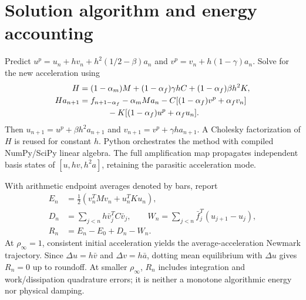 \documentclass[10pt,a4paper]{article}
\begin{document}
\section{Solution algorithm and energy accounting}
Predict $u^p=u_n+h v_n+h^2(1/2-\beta)a_n$ and $v^p=v_n+h(1-\gamma)a_n$. Solve for the new acceleration using
\begin{align}
H&=(1-\alpha_m)M+(1-\alpha_f)\gamma h C+(1-\alpha_f)\beta h^2K,\\
Ha_{n+1}&=f_{n+1-\alpha_f}-\alpha_mMa_n
-C[(1-\alpha_f)v^p+\alpha_f v_n]\nonumber\\
&\hspace{12mm}-K[(1-\alpha_f)u^p+\alpha_f u_n].
\end{align}
Then $u_{n+1}=u^p+\beta h^2a_{n+1}$ and $v_{n+1}=v^p+\gamma h a_{n+1}$. A Cholesky factorization of $H$ is reused for constant $h$. Python orchestrates the method with compiled NumPy/SciPy linear algebra. The full amplification map propagates independent basis states of $[u,hv,h^2a]$, retaining the parasitic acceleration mode.

With arithmetic endpoint averages denoted by bars, report
\begin{align}
E_n&=\tfrac12(v_n^TMv_n+u_n^TKu_n),\\
D_n&=\sum_{j<n}h\bar v_j^TC\bar v_j,\qquad
W_n=\sum_{j<n}\bar f_j^T(u_{j+1}-u_j),\\
R_n&=E_n-E_0+D_n-W_n.
\end{align}
At $\rho_\infty=1$, consistent initial acceleration yields the average-acceleration Newmark trajectory. Since $\Delta u=h\bar v$ and $\Delta v=h\bar a$, dotting mean equilibrium with $\Delta u$ gives $R_n=0$ up to roundoff. At smaller $\rho_\infty$, $R_n$ includes integration and work/dissipation quadrature errors; it is neither a monotone algorithmic energy nor physical damping.
\end{document}
